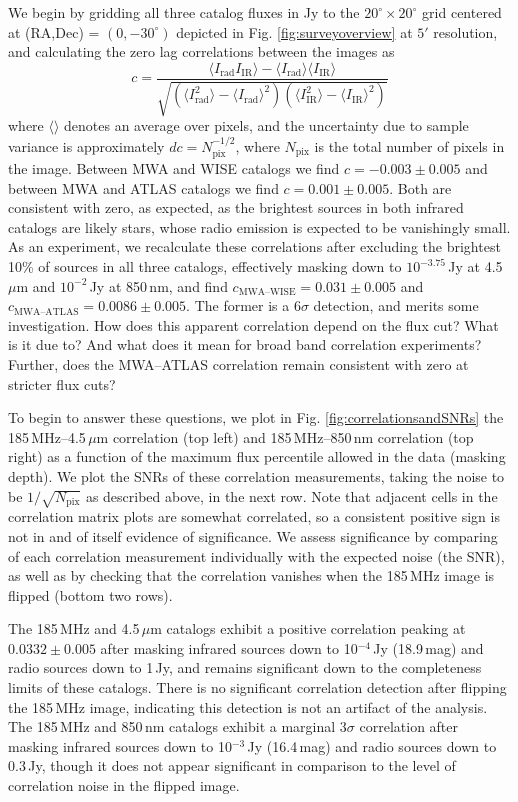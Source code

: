 \documentclass{emulateapj}
\newcommand{\rad}{\text{rad}}
\newcommand{\IR}{\text{IR}}
\begin{document}
We begin by gridding all three catalog fluxes in Jy to the $20^\circ\times20^\circ$ grid centered at (RA,Dec) = $(0, -30^\circ)$ depicted in Fig. \ref{fig:surveyoverview} at $5'$ resolution, and calculating the zero lag correlations between the images as
\begin{equation}
\label{eqn:imagecorrdef}
	c = \frac{\langle I_\rad I_\IR\rangle-\langle I_\rad\rangle\langle I_\IR\rangle}{\sqrt{(\langle I_\rad^2\rangle -\langle I_\rad\rangle^2)(\langle I_\IR^2\rangle -\langle I_\IR\rangle^2)}}
\end{equation}
where $\langle\rangle$ denotes an average over pixels, and the uncertainty due to sample variance is approximately $dc=N_\text{pix}^{-1/2}$, where $N_\text{pix}$ is the total number of pixels in the image. Between MWA and WISE catalogs we find $c=-0.003\pm0.005$ and between MWA and ATLAS catalogs we find $c=0.001\pm0.005$. Both are consistent with zero, as expected, as the brightest sources in both infrared catalogs are likely stars, whose radio emission is expected to be vanishingly small. As an experiment, we recalculate these correlations after excluding the brightest 10\% of sources in all three catalogs, effectively masking down to $10^{-3.75}$\,Jy at 4.5\,$\mu$m and $10^{-2}$\,Jy at 850\,nm, and find $c_\text{MWA--WISE}=0.031\pm0.005$ and $c_\text{MWA--ATLAS}=0.0086\pm0.005$. The former is a $6\sigma$ detection, and merits some investigation. How does this apparent correlation depend on the flux cut? What is it due to? And what does it mean for broad band correlation experiments? Further, does the MWA--ATLAS correlation remain consistent with zero at stricter flux cuts?

To begin to answer these questions, we plot in Fig. \ref{fig:correlationsandSNRs} the 185\,MHz--4.5\,$\mu$m correlation (top left) and 185\,MHz--850\,nm correlation (top right) as a function of the maximum flux percentile allowed in the data (masking depth). We plot the SNRs of these correlation measurements, taking the noise to be $1/\sqrt{N_\text{pix}}$ as described above, in the next row. Note that adjacent cells in the correlation matrix plots are somewhat correlated, so a consistent positive sign is not in and of itself evidence of significance. We assess significance by comparing of each correlation measurement individually with the expected noise (the SNR), as well as by checking that the correlation vanishes when the 185\,MHz image is flipped (bottom two rows).

The 185\,MHz and 4.5\,$\mu$m catalogs exhibit a positive correlation peaking at $0.0332\pm0.005$ after masking infrared sources down to 10$^{-4}$\,Jy (18.9\,mag) and radio sources down to 1\,Jy, and remains significant down to the completeness limits of these catalogs. There is no significant correlation detection after flipping the 185\,MHz image, indicating this detection is not an artifact of the analysis. The 185\,MHz and 850\,nm catalogs exhibit a marginal $3\sigma$ correlation after masking infrared sources down to 10$^{-3}$\,Jy (16.4\,mag) and radio sources down to 0.3\,Jy, though it does not appear significant in comparison to the level of correlation noise in the flipped image.
\end{document}
